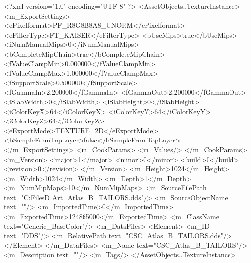 <?xml version="1.0" encoding="UTF-8" ?>
<AssetObjects..TextureInstance>
	<m_ExportSettings>
		<ePixelformat>PF_R8G8B8A8_UNORM</ePixelformat>
		<eFilterType>FT_KAISER</eFilterType>
		<bUseMips>true</bUseMips>
		<iNumManualMips>0</iNumManualMips>
		<bCompleteMipChain>true</bCompleteMipChain>
		<fValueClampMin>0.000000</fValueClampMin>
		<fValueClampMax>1.000000</fValueClampMax>
		<fSupportScale>0.500000</fSupportScale>
		<fGammaIn>2.200000</fGammaIn>
		<fGammaOut>2.200000</fGammaOut>
		<iSlabWidth>0</iSlabWidth>
		<iSlabHeight>0</iSlabHeight>
		<iColorKeyX>64</iColorKeyX>
		<iColorKeyY>64</iColorKeyY>
		<iColorKeyZ>64</iColorKeyZ>
		<eExportMode>TEXTURE_2D</eExportMode>
		<bSampleFromTopLayer>false</bSampleFromTopLayer>
	</m_ExportSettings>
	<m_CookParams>
		<m_Values/>
	</m_CookParams>
	<m_Version>
		<major>1</major>
		<minor>0</minor>
		<build>0</build>
		<revision>0</revision>
	</m_Version>
	<m_Height>1024</m_Height>
	<m_Width>1024</m_Width>
	<m_Depth>1</m_Depth>
	<m_NumMipMaps>10</m_NumMipMaps>
	<m_SourceFilePath text="C:\Users\Shadow\Desktop\Working Files\3D Art\Textures\CSC_Atlas_B_TAILORS.dds"/>
	<m_SourceObjectName text=""/>
	<m_ImportedTime>0</m_ImportedTime>
	<m_ExportedTime>124865000</m_ExportedTime>
	<m_ClassName text="Generic_BaseColor"/>
	<m_DataFiles>
		<Element>
			<m_ID text="DDS"/>
			<m_RelativePath text="CSC_Atlas_B_TAILORS.dds"/>
		</Element>
	</m_DataFiles>
	<m_Name text="CSC_Atlas_B_TAILORS"/>
	<m_Description text=""/>
	<m_Tags/>
</AssetObjects..TextureInstance>


